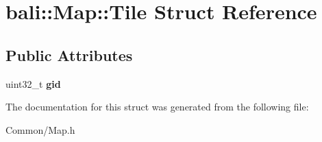 \hypertarget{structbali_1_1_map_1_1_tile}{\section{bali\-:\-:Map\-:\-:Tile Struct Reference}
\label{structbali_1_1_map_1_1_tile}
}
\subsection*{Public Attributes}
\begin{DoxyCompactItemize}
\item 
\hypertarget{structbali_1_1_map_1_1_tile_acd16f8507bb80d663b3cb1f66aba699b}{uint32\-\_\-t {\bfseries gid}}\label{structbali_1_1_map_1_1_tile_acd16f8507bb80d663b3cb1f66aba699b}

\end{DoxyCompactItemize}


The documentation for this struct was generated from the following file\-:\begin{DoxyCompactItemize}
\item 
Common/Map.\-h\end{DoxyCompactItemize}
